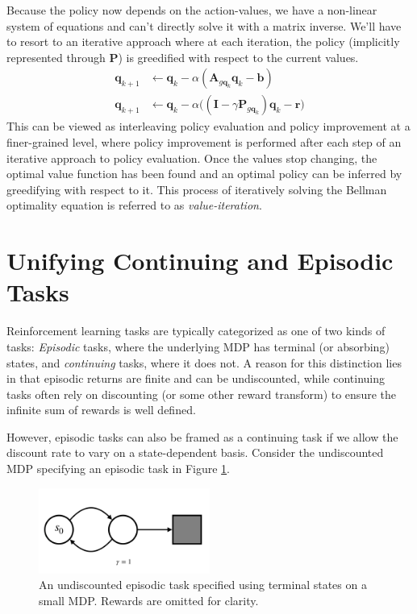\documentclass[twoside]{article}
\begin{document}
Because the policy now depends on the action-values, we have a non-linear system of equations and can't directly solve it with a matrix inverse. We'll have to resort to an iterative approach where at each iteration, the policy (implicitly represented through $\mathbf{P}$) is greedified with respect to the current values.
\begin{align}
    \nonumber
    \mathbf{q}_{k+1} &\leftarrow \mathbf{q}_{k} - \alpha(\mathbf{A}_{g\mathbf{q}_k}\mathbf{q}_k - \mathbf{b}) \\
    \mathbf{q}_{k+1} &\leftarrow \mathbf{q}_{k} - \alpha\big((\mathbf{I} - \gamma \mathbf{P}_{g \mathbf{q}_k})\mathbf{q}_k - \mathbf{r}\big)
\end{align}
This can be viewed as interleaving policy evaluation and policy improvement at a finer-grained level, where policy improvement is performed after each step of an iterative approach to policy evaluation. Once the values stop changing, the optimal value function has been found and an optimal policy can be inferred by greedifying with respect to it. This process of iteratively solving the Bellman optimality equation is referred to as \textit{value-iteration}.

\section{Unifying Continuing and Episodic Tasks}

Reinforcement learning tasks are typically categorized as one of two kinds of tasks: \textit{Episodic} tasks, where the underlying MDP has terminal (or absorbing) states, and \textit{continuing} tasks, where it does not. A reason for this distinction lies in that episodic returns are finite and can be undiscounted, while continuing tasks often rely on discounting (or some other reward transform) to ensure the infinite sum of rewards is well defined.

However, episodic tasks can also be framed as a continuing task if we allow the discount rate to vary on a state-dependent basis. Consider the undiscounted MDP specifying an episodic task in Figure \ref{fig:mdp_episodic}.

\begin{figure}[!h]
    \centering
    \includegraphics[width=0.5\textwidth]{mdp_episodic}
    \caption{An undiscounted episodic task specified using terminal states on a small MDP. Rewards are omitted for clarity.}
    \label{fig:mdp_episodic}
\end{figure}
\end{document}
